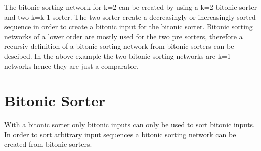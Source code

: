 \documentclass{article}
\begin{document}
The bitonic sorting network for k=2 can be created by using a k=2 bitonic sorter and two k=k-1 sorter.
The two sorter create a decreasingly or increasingly sorted sequence in order to create a bitonic input for the bitonic sorter.
Bitonic sorting networks of a lower order are mostly used for the two pre sorters, therefore a recursiv definition of a bitonic sorting network from bitonic sorters can be descibed.
In the above example the two bitonic sorting networks are k=1 networks hence they are just a comparator.

\section{Bitonic Sorter}

With a bitonic sorter only bitonic inputs can only be used to sort bitonic inputs. 
In order to sort arbitrary input sequences a bitonic sorting network can be created from bitonic sorters.
\end{document}
